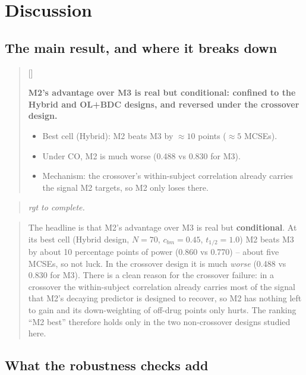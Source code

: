 \documentclass[
  11pt,
]{article}
\newcounter{pgraph}
\newenvironment{bullets}{%
  \stepcounter{pgraph}%
  \begin{quote}\small\sffamily\color[gray]{0.30}%
  {\normalfont\scriptsize\color[gray]{0.58}[\thepgraph]\enspace}}{%
  \end{quote}}
\newenvironment{rgt}{%
  \begin{quote}\small\itshape\color[RGB]{20,60,160}}{%
  \end{quote}}
\newenvironment{orig}{%
  \begin{quote}\normalsize\color[gray]{0.55}}{%
  \end{quote}}
\begin{document}
\section{Discussion}\label{discussion}

\subsection{The main result, and where it breaks down}\label{the-main-result-and-where-it-breaks-down}

\begin{bullets}

\textbf{M2's advantage over M3 is real but conditional: confined to
the Hybrid and OL+BDC designs, and reversed under the crossover
design.}

\begin{itemize}\setlength{\itemsep}{2pt}\setlength{\parskip}{0pt}
\item Best cell (Hybrid): M2 beats M3 by $\approx 10$ points
($\approx 5$ MCSEs).
\item Under CO, M2 is much worse (0.488 vs 0.830 for M3).
\item Mechanism: the crossover's within-subject correlation already
carries the signal M2 targets, so M2 only loses there.
\end{itemize}

\end{bullets}

\begin{rgt}
rgt to complete.

\end{rgt}

\begin{orig}
The headline is that M2's advantage over M3 is real but
\textbf{conditional}. At its best cell (Hybrid design, \(N = 70\),
\(c_{bm} = 0.45\), \(t_{1/2} = 1.0\)) M2 beats M3 by about 10 percentage
points of power (0.860 vs 0.770) -- about five MCSEs, so not luck.
In the crossover design it is much \emph{worse} (0.488 vs 0.830 for M3).
There is a clean reason for the crossover failure: in a crossover the
within-subject correlation already carries most of the signal that
M2's decaying predictor is designed to recover, so M2 has nothing
left to gain and its down-weighting of off-drug points only hurts.
The ranking ``M2 best'' therefore holds only in the two non-crossover
designs studied here.

\end{orig}

\subsection{What the robustness checks add}\label{what-the-robustness-checks-add}
\end{document}
